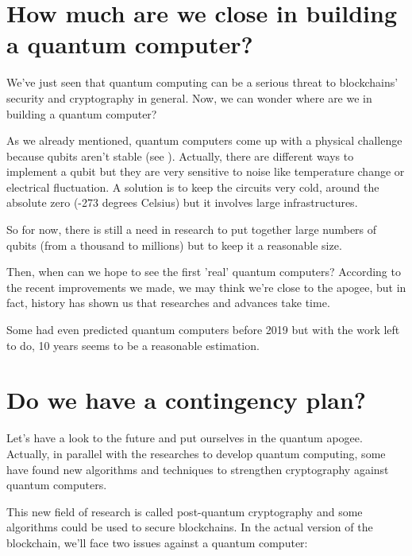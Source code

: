 \section{How much are we close in building a quantum computer?}

We've just seen that quantum computing can be a serious threat to blockchains' security and cryptography in general. Now, we can wonder where are we in building a quantum computer? \newline

As we already mentioned, quantum computers come up with a physical challenge because qubits aren't stable (see \cite{closeToQuantum}). Actually, there are different ways to implement a qubit but they are very sensitive to noise like temperature change or electrical fluctuation. A solution is to keep the circuits very cold, around the absolute zero (-273 degrees Celsius) but it involves large infrastructures.

So for now, there is still a need in research to put together large numbers of qubits (from a thousand to millions) but to keep it a reasonable size. \newline

Then, when can we hope to see the first 'real' quantum computers? According to the recent improvements we made, we may think we're close to the apogee, but in fact, history has shown us that researches and advances take time. \newline

Some had even predicted quantum computers before 2019 but with the work left to do, 10 years seems to be a reasonable estimation.

\section{Do we have a contingency plan?}

Let's have a look to the future and put ourselves in the quantum apogee. Actually, in parallel with the researches to develop quantum computing, some have found new algorithms and techniques to strengthen cryptography against quantum computers.

This new field of research is called post-quantum cryptography and some algorithms could be used to secure blockchains. In the actual version of the blockchain, we'll face two issues against a quantum computer: \newline


